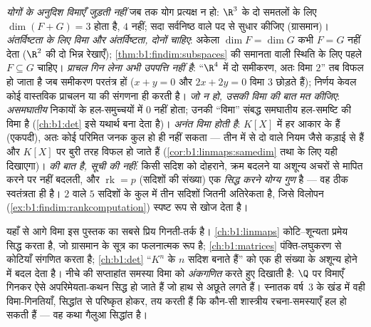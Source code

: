 \begin{remark}[सामान्य भूलें]
\label{rem:b1:findim:pitfalls}
\emph{योगों के अनुदिश विमाएँ जुड़ती नहीं} जब तक योग प्रत्यक्ष न हो: $\R^3$
के दो समतलों के लिए $\dim(F + G) = 3$ होता है, $4$ नहीं; सदा सर्वनिष्ठ वाले
पद से सुधार कीजिए (ग्रासमान)। \emph{अंतर्विष्टता के लिए विमा \emph{और}
अंतर्विष्टता, दोनों चाहिए}: अकेला $\dim F = \dim G$ कभी $F = G$ नहीं देता
($\R^2$ की दो भिन्न रेखाएँ); \cref{thm:b1:findim:subspaces} की समानता वाली
स्थिति के लिए पहले $F \subseteq G$ चाहिए। \emph{प्राचल गिन लेना अभी उपपत्ति
नहीं है}: ``$\R^4$ में दो समीकरण, अतः विमा $2$'' तब विफल हो जाता है जब
समीकरण परतंत्र हों ($x + y = 0$ और $2x + 2y = 0$ विमा $3$ छोड़ते हैं);
निर्णय केवल कोई वास्तविक प्राचलन या  की संगणना ही करती है। \emph{जो
 न हो, उसकी विमा की बात मत कीजिए}: \emph{असमघातीय} निकायों के
हल-समुच्चयों में $0$ नहीं होता; उनकी ``विमा'' संबद्ध समघातीय हल-समष्टि की
विमा है (\cref{ch:b1:det} इसे यथार्थ बना देता है)। \emph{अनंत विमा होती है}:
$K[X]$ में हर आकार के  हैं (एकपदी), अतः कोई परिमित जनक कुल हो ही
नहीं सकता --- तीन में से दो वाले नियम जैसे  कड़ाई से  हैं और
$K[X]$ पर बुरी तरह विफल हो जाते हैं (\cref{cor:b1:linmaps:samedim}  तथा
 के लिए यही दिखाएगा)। \emph{  की बात है, सूची की
नहीं}: किसी सदिश को दोहराने, क्रम बदलने या अशून्य अचरों से मापित करने पर
 नहीं बदलती, और $\operatorname{rk} = p$ (सदिशों की संख्या) एक
\emph{सिद्ध करने योग्य गुण} है --- वह ठीक स्वतंत्रता ही है। $2$  वाले
$5$ सदिशों के कुल में तीन सदिशों जितनी अतिरेकता है, जिसे विलोपन
(\cref{ex:b1:findim:rankcomputation}) स्पष्ट रूप से खोज देता है।
\end{remark}

\begin{remark}[विमा कहाँ काम पर जाती है]
\label{rem:b1:findim:whereused}
यहाँ से आगे विमा इस पुस्तक का सबसे प्रिय गिनती-तर्क है। \cref{ch:b1:linmaps}
कोटि--शून्यता प्रमेय सिद्ध करता है, जो ग्रासमान के सूत्र का फलनात्मक रूप है;
\cref{ch:b1:matrices} पंक्ति-लघुकरण से कोटियाँ संगणित करता है;
\cref{ch:b1:det} ``$K^n$ के $n$ सदिश  बनाते हैं'' को एक ही संख्या के
अशून्य होने में बदल देता है। नीचे की सप्ताहांत समस्या विमा को \emph{अंकगणित}
करते हुए दिखाती है:  $\Q$ पर विमाएँ गिनकर ऐसे अपरिमेयता-कथन सिद्ध हो
जाते हैं जो हाथ से अछूते लगते हैं। स्नातक वर्ष~3 के खंड में वही
विमा-गिनतियाँ,  सिद्धांत से परिष्कृत होकर, तय करती हैं कि कौन-सी
शास्त्रीय रचना-समस्याएँ हल हो सकती हैं --- वह कथा गैलुआ सिद्धांत है।
\end{remark}

